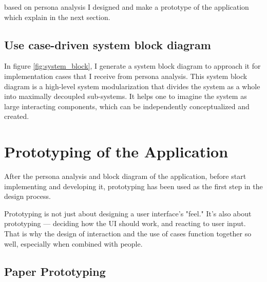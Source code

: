 based on persona analysis I designed and make a prototype of the application which explain in the next section.

\subsection{Use case-driven system block diagram}
In figure \ref{fig:system_block}, I generate a system block diagram to approach it for implementation cases that I receive from persona analysis. This system block diagram is a high-level system modularization that divides the system as a whole into maximally decoupled sub-systems. It helps one to imagine the system as large interacting components, which can be independently conceptualized and created.


\section{Prototyping of the Application}

After the persona analysis and block diagram of the application, before start implementing and developing it, prototyping has been used as the first step in the design process.

Prototyping is not just about designing a user interface's "feel." It's also about prototyping — deciding how the \acs{UI} should work, and reacting to user input. That is why the design of interaction and the use of cases function together so well, especially when combined with people.\citep{Stephens2006PersonaAnalysis}

\subsection{Paper Prototyping}

